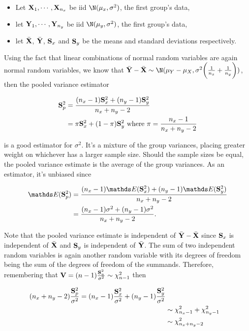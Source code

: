 \documentclass{homework}
\begin{document}
\begin{itemize}
    \item Let ${\bf X}_1, \cdots, {\bf X}_{n_x}$ be iid $\N(\mu_x,\sigma^2)$, the first group's data,
    \item let ${\bf Y}_1, \cdots, {\bf Y}_{n_y}$ be iid $\N(\mu_y,\sigma^2)$,  the first group's data,
    \item let $\bar{\bf X}$, $\bar{\bf Y}$, ${\bf S}_x$ and ${\bf S}_y$ be the means and standard deviations respectively.
\end{itemize}

Using the fact that linear combinations of normal random variables are again normal random variables, we know that $\bar{\bf Y}-\bar{\bf X} \sim \N(\mu_Y-\mu_X, \sigma^2\bigg(\frac{1}{n_x}+\frac{1}{n_y}\bigg))$, then the pooled variance estimator

\begin{align*}
{\bf S}_p^2 &= \frac{(n_x-1){\bf S}_x^2+(n_y-1){\bf S}_y^2}{n_x+n_y-2} \\
&= \pi {\bf S}_x^2 + (1-\pi) {\bf S}_y^2 \textnormal{ where } \pi=\frac{n_x-1}{n_x+n_y-2} 
\end{align*}

is a good estimator for $\sigma^2$. It's a mixture of the group variances, placing greater weight on whichever has a larger sample size. Should the sample sizes be equal, the pooled variance estimate is the average of the group variances. As an estimator, it's unbiased since 

\begin{align*}
    \E({\bf S}_p^2) &= \frac{(n_x-1)\E({\bf S}_x^2)+(n_y-1)\E({\bf S}_y^2)}{n_x+n_y-2} \\
    &= \frac{(n_x-1)\sigma^2+(n_y-1)\sigma^2}{n_x+n_y-2}.
\end{align*}

Note that the pooled variance estimate is independent of $\bar{\bf Y}-\bar{\bf X}$ since ${\bf S}_x$ is independent of $\bar{\bf X}$ and ${\bf S}_y$ is independent of $\bar{\bf Y}$. The sum of two independent \chidis random variables is again another random variable with its degrees of freedom being the sum of the degrees of freedom of the summands. Therefore, remembering that ${\bf V} = (n-1) \frac{{\bf S}_{n}^2}{\sigma^2} \sim \chi^2_{n-1}$ then

\begin{align*}
    (n_x+n_y-2)\frac{{\bf S}_{p}^2}{\sigma^2} = (n_x-1) \frac{{\bf S}_{x}^2}{\sigma^2} + (n_y-1) \frac{{\bf S}_{y}^2}{\sigma^2} \\
    &\sim \chi^2_{n_x-1} + \chi^2_{n_y-1} \\
    &\sim \chi^2_{n_x+n_y-2}
\end{align*}
\end{document}
